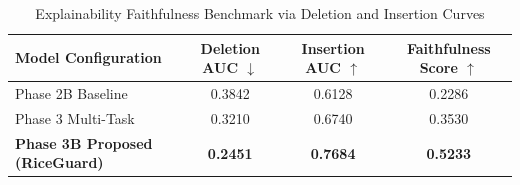 \begin{table}[htbp]
\centering
\caption{Explainability Faithfulness Benchmark via Deletion and Insertion Curves}
\label{tab:faithfulness}
\begin{tabular}{lccc}
\hline
\textbf{Model Configuration} & \textbf{Deletion AUC $\downarrow$} & \textbf{Insertion AUC $\uparrow$} & \textbf{Faithfulness Score $\uparrow$} \\
\hline
Phase 2B Baseline & 0.3842 & 0.6128 & 0.2286 \\
Phase 3 Multi-Task & 0.3210 & 0.6740 & 0.3530 \\
\textbf{Phase 3B Proposed (RiceGuard)} & \textbf{0.2451} & \textbf{0.7684} & \textbf{0.5233} \\
\hline
\end{tabular}
\end{table}
